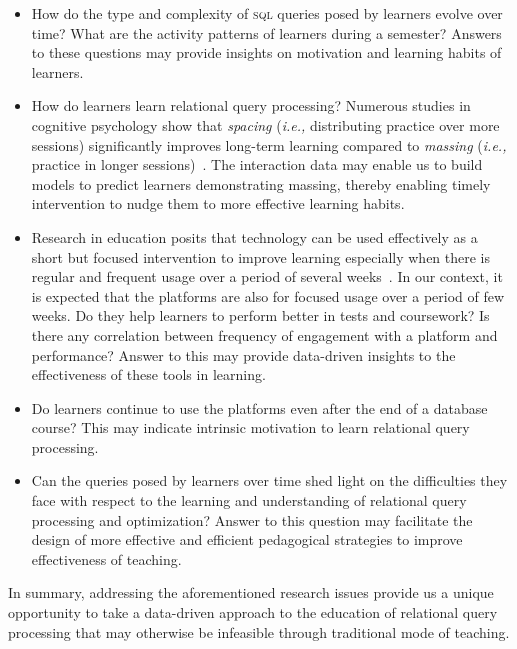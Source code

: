 \documentclass[11pt]{article}
\newcommand{\ie}{\emph{i.e.,}\xspace}
\begin{document}
\begin{itemize} \itemsep = -0.5ex

\item How do the type and complexity of \textsc{sql} queries posed by learners evolve over time? What are the activity patterns of learners during a semester? Answers to these questions may provide insights on motivation and learning habits of learners.  

\item How do learners learn relational query processing? Numerous studies in cognitive psychology show that \textit{spacing} (\ie distributing practice over more sessions) significantly improves long-term learning compared to \textit{massing} (\ie practice in longer sessions)~\cite{BB11,BDK13,SB15,TR10}. The interaction data may enable us to build models to predict learners demonstrating massing, thereby enabling timely intervention to nudge them to more effective learning habits.

\item Research in education posits that technology can be used effectively as a short but focused intervention to improve learning especially when there is regular and frequent usage over a period of several weeks~\cite{HXK12}. In our context, it is expected that the platforms are also for focused usage over a period of few weeks. Do they help learners to perform better in tests and coursework? Is there any correlation between frequency of engagement with a platform and performance? Answer to this may provide data-driven insights to the effectiveness of these tools in learning. 

\item Do learners continue to use the platforms even after the end of a database course? This may indicate intrinsic motivation to learn relational query processing. 

\item Can the queries posed by learners over time shed light on the difficulties they face with respect to the learning and understanding of relational query processing and optimization? Answer to this question may facilitate the design of more effective and efficient pedagogical strategies to improve effectiveness of teaching.


\end{itemize} 

In summary, addressing the aforementioned research issues provide us a unique opportunity to take a data-driven approach to the education of relational query processing that may otherwise be infeasible through traditional mode of teaching.
\end{document}
